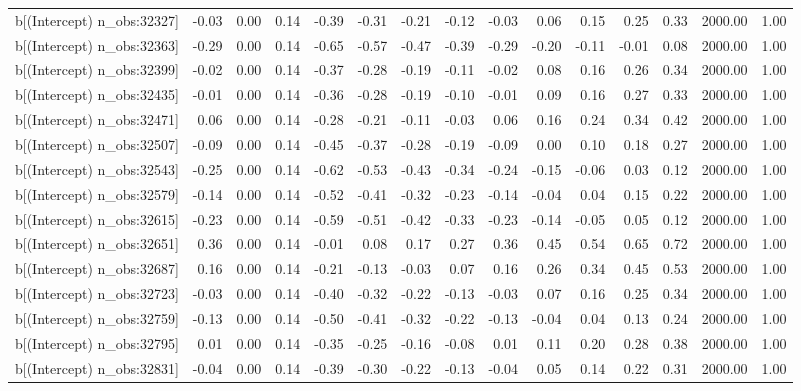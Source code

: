 \begin{table}[ht]
\begin{tabular}{rrrrrrrrrrrrrrr}
  b[(Intercept) n\_obs:32327] & -0.03 & 0.00 & 0.14 & -0.39 & -0.31 & -0.21 & -0.12 & -0.03 & 0.06 & 0.15 & 0.25 & 0.33 & 2000.00 & 1.00 \\ 
  b[(Intercept) n\_obs:32363] & -0.29 & 0.00 & 0.14 & -0.65 & -0.57 & -0.47 & -0.39 & -0.29 & -0.20 & -0.11 & -0.01 & 0.08 & 2000.00 & 1.00 \\ 
  b[(Intercept) n\_obs:32399] & -0.02 & 0.00 & 0.14 & -0.37 & -0.28 & -0.19 & -0.11 & -0.02 & 0.08 & 0.16 & 0.26 & 0.34 & 2000.00 & 1.00 \\ 
  b[(Intercept) n\_obs:32435] & -0.01 & 0.00 & 0.14 & -0.36 & -0.28 & -0.19 & -0.10 & -0.01 & 0.09 & 0.16 & 0.27 & 0.33 & 2000.00 & 1.00 \\ 
  b[(Intercept) n\_obs:32471] & 0.06 & 0.00 & 0.14 & -0.28 & -0.21 & -0.11 & -0.03 & 0.06 & 0.16 & 0.24 & 0.34 & 0.42 & 2000.00 & 1.00 \\ 
  b[(Intercept) n\_obs:32507] & -0.09 & 0.00 & 0.14 & -0.45 & -0.37 & -0.28 & -0.19 & -0.09 & 0.00 & 0.10 & 0.18 & 0.27 & 2000.00 & 1.00 \\ 
  b[(Intercept) n\_obs:32543] & -0.25 & 0.00 & 0.14 & -0.62 & -0.53 & -0.43 & -0.34 & -0.24 & -0.15 & -0.06 & 0.03 & 0.12 & 2000.00 & 1.00 \\ 
  b[(Intercept) n\_obs:32579] & -0.14 & 0.00 & 0.14 & -0.52 & -0.41 & -0.32 & -0.23 & -0.14 & -0.04 & 0.04 & 0.15 & 0.22 & 2000.00 & 1.00 \\ 
  b[(Intercept) n\_obs:32615] & -0.23 & 0.00 & 0.14 & -0.59 & -0.51 & -0.42 & -0.33 & -0.23 & -0.14 & -0.05 & 0.05 & 0.12 & 2000.00 & 1.00 \\ 
  b[(Intercept) n\_obs:32651] & 0.36 & 0.00 & 0.14 & -0.01 & 0.08 & 0.17 & 0.27 & 0.36 & 0.45 & 0.54 & 0.65 & 0.72 & 2000.00 & 1.00 \\ 
  b[(Intercept) n\_obs:32687] & 0.16 & 0.00 & 0.14 & -0.21 & -0.13 & -0.03 & 0.07 & 0.16 & 0.26 & 0.34 & 0.45 & 0.53 & 2000.00 & 1.00 \\ 
  b[(Intercept) n\_obs:32723] & -0.03 & 0.00 & 0.14 & -0.40 & -0.32 & -0.22 & -0.13 & -0.03 & 0.07 & 0.16 & 0.25 & 0.34 & 2000.00 & 1.00 \\ 
  b[(Intercept) n\_obs:32759] & -0.13 & 0.00 & 0.14 & -0.50 & -0.41 & -0.32 & -0.22 & -0.13 & -0.04 & 0.04 & 0.13 & 0.24 & 2000.00 & 1.00 \\ 
  b[(Intercept) n\_obs:32795] & 0.01 & 0.00 & 0.14 & -0.35 & -0.25 & -0.16 & -0.08 & 0.01 & 0.11 & 0.20 & 0.28 & 0.38 & 2000.00 & 1.00 \\ 
  b[(Intercept) n\_obs:32831] & -0.04 & 0.00 & 0.14 & -0.39 & -0.30 & -0.22 & -0.13 & -0.04 & 0.05 & 0.14 & 0.22 & 0.31 & 2000.00 & 1.00 \\ 

\end{tabular}
\end{table}
